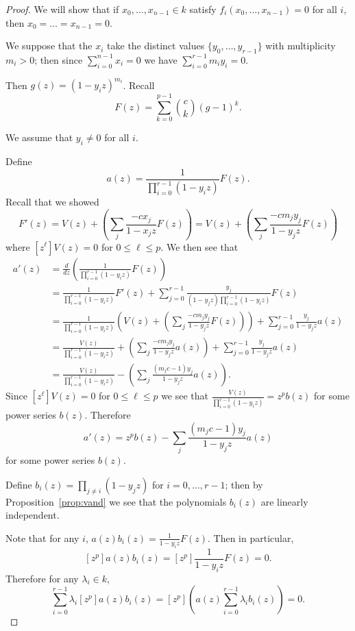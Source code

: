 \documentclass{amsart}
\numberwithin{equation}{section}
\theoremstyle{definition}
\begin{document}
\begin{proof} 

We will show that if $x_0,\dots,x_{n-1} \in k$ satisfy $f_i(x_0,\dots,x_{n-1})=0$ for all $i$, then $x_0=\dots=x_{n-1}=0$. 



We suppose that the $x_i$ take the distinct values $\{y_0,\dots,y_{r-1}\}$ with multiplicity $m_i>0$; then since $\sum_{i=0}^{n-1} x_i=0$ we have $\sum_{i=0}^{r-1} m_iy_i=0$. 

Then $g(z)=(1-y_iz)^{m_i}$. Recall $$F(z)=\sum_{k=0}^{p-1} \binom{c}{k}(g-1)^k.$$

We assume that $y_i \ne 0$ for all $i$.

Define $$a(z)=\frac{1}{\prod_{i=0}^{r-1}(1-y_iz)}F(z).$$ Recall that we showed $$F'(z)=V(z)+\left(\sum_j \frac{-cx_j}{1-x_jz}F(z)\right)=V(z)+\left(\sum_j \frac{-cm_jy_j}{1-y_jz}F(z)\right)$$ where $[z^\ell]V(z)=0$ for $0 \le \ell \le p$. We then see that
\begin{align*}
a'(z)&=\frac{d}{dz}\left(\frac{1}{\prod_{i=0}^{r-1}(1-y_iz)}F(z)\right)\\
&=\frac{1}{\prod_{i=0}^{r-1}(1-y_iz)}F'(z)+\sum_{j=0}^{r-1}\frac{y_j}{(1-y_jz)\prod_{i=0}^{r-1}(1-y_iz)}F(z)\\
&=\frac{1}{\prod_{i=0}^{r-1}(1-y_iz)}\left(V(z)+\left(\sum_j \frac{-cm_jy_j}{1-y_jz}F(z)\right)\right)+\sum_{j=0}^{r-1}\frac{y_j}{1-y_jz}a(z)\\
&=\frac{V(z)}{\prod_{i=0}^{r-1}(1-y_iz)}+\left(\sum_j \frac{-cm_jy_j}{1-y_jz}a(z)\right)+\sum_{j=0}^{r-1}\frac{y_j}{1-y_jz}a(z)\\
&=\frac{V(z)}{\prod_{i=0}^{r-1}(1-y_iz)}-\left(\sum_j \frac{(m_jc-1)y_j}{1-y_jz}a(z)\right).
\end{align*}
Since $[z^\ell]V(z)=0$ for $0 \le \ell \le p$ we see that $\frac{V(z)}{\prod_{i=0}^{r-1}(1-y_iz)}=z^pb(z)$ for some power series $b(z)$. Therefore $$a'(z)=z^pb(z)-\sum_j \frac{(m_jc-1)y_j}{1-y_jz}a(z)$$ for some power series $b(z)$.

Define $b_i(z)=\prod_{j \ne i} (1-y_jz)$ for $i=0,\dots,r-1$; then by Proposition~\ref{prop:vand} we see that the polynomials $b_i(z)$ are linearly independent. 

Note that for any $i$, $a(z)b_i(z)=\frac{1}{1-y_iz}F(z)$. Then in particular, $$[z^p]a(z)b_i(z)=[z^p]\frac{1}{1-y_iz}F(z)=0.$$ Therefore for any $\lambda_i \in k$, \begin{equation}\label{eq:lincomb}\sum_{i=0}^{r-1} \lambda_i[z^p]a(z)b_i(z)=[z^p]\left( a(z)\sum_{i=0}^{r-1}\lambda_ib_i(z)\right)=0.\end{equation}


\end{proof}
\end{document}
